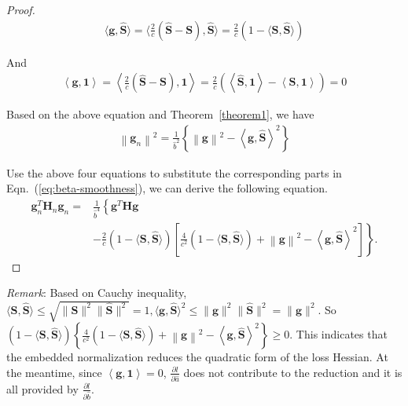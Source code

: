 \documentclass[sigconf]{acmart}
\begin{document}
\begin{proof}
\begin{align}
\langle{\mathbf{g}},\hat{\mathbf{S}}\rangle = \langle\frac{2}{c}(\hat{\mathbf{S}}-\mathbf{S}),\hat{\mathbf{S}}\rangle=\frac{2}{c}(1-\langle\mathbf{S},\hat{\mathbf{S}}\rangle)
\end{align}

And
\begin{align}
\left\langle{\mathbf{g}},\mathbf{1}\right\rangle=\left\langle\frac{2}{c}(\hat{\mathbf{S}}-{\mathbf{S}}),\mathbf{1}\right\rangle=\frac{2}{c}\left(\left\langle\hat{\mathbf{S}},\mathbf{1}\right\rangle-\left\langle{\mathbf{S}},\mathbf{1}\right\rangle\right)=0
\end{align}

Based on the above equation and Theorem~\ref{theorem1}, we have
\begin{align}
\left\|\mathbf{g}_n\right\|^2 = \frac{1}{\hat{b}^2} \left\{\left\|{\mathbf{g}}\right\|^2-\left\langle{\mathbf{g}},\hat{\mathbf{S}}\right\rangle^2\right\} 
\end{align}

Use the above four equations to substitute the corresponding parts in Eqn.~(\ref{eq:beta-smoothness}), we can derive the following equation.
\begin{align}
    {\mathbf{g}}_n^T\mathbf{H}_n{\mathbf{g}}_n = & \frac{1}{\hat{b}^4} \left\{\mathbf{g}^T\mathbf{H}\mathbf{g}\right. \nonumber\\
    & \left.-\frac{2}{c}\left(1-\langle{\mathbf{S}},\hat{\mathbf{S}}\rangle\right)\left[\frac{4}{c^2}\left(1-\langle{\mathbf{S}},\hat{\mathbf{S}}\rangle\right)+\left\|{\mathbf{g}}\right\|^2-\left\langle{\mathbf{g}},\hat{\mathbf{S}}\right\rangle^2\right]\right\}.
\end{align}

\end{proof}

\textit{Remark}: Based on Cauchy inequality, $\langle{\mathbf{S}},\hat{\mathbf{S}}\rangle\le\sqrt{\|\mathbf{S}\|^2\|\hat{\mathbf{S}}\|^2}=1, \langle{\mathbf{g}},\hat{\mathbf{S}}\rangle^2\le\|{\mathbf{g}}\|^2\|\hat{\mathbf{S}}\|^2=\|{\mathbf{g}}\|^2$. So $\left(1-\langle{\mathbf{S}},\hat{\mathbf{S}}\rangle\right)\left\{\frac{4}{c^2}\left(1-\langle{\mathbf{S}},\hat{\mathbf{S}}\rangle\right)+\left\|{\mathbf{g}}\right\|^2-\left\langle{\mathbf{g}},\hat{\mathbf{S}}\right\rangle^2\right\}\ge0$. 
This indicates that the embedded normalization reduces the quadratic form of the loss Hessian. 
At the meantime, since $\left\langle{\mathbf{g}},\mathbf{1}\right\rangle=0$, $\frac{\partial l}{\partial \hat{a}}$ does not contribute to the reduction and it is all provided by $\frac{\partial l}{\partial \hat{b}}$.
\end{document}
